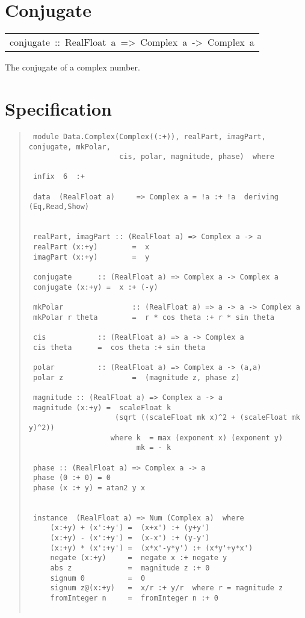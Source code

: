 \section{Conjugate
}
\begin{haddockdesc}
\item[\begin{tabular}{@{}l}
conjugate\ ::\ RealFloat\ a\ =>\ Complex\ a\ ->\ Complex\ a
\end{tabular}]\haddockbegindoc
The conjugate of a complex number.
\par

\end{haddockdesc}
\section{Specification
}
\begin{quote}
{\haddockverb\begin{verbatim}
 module Data.Complex(Complex((:+)), realPart, imagPart, conjugate, mkPolar,
                     cis, polar, magnitude, phase)  where
 
 infix  6  :+
 
 data  (RealFloat a)     => Complex a = !a :+ !a  deriving (Eq,Read,Show)
 
 
 realPart, imagPart :: (RealFloat a) => Complex a -> a
 realPart (x:+y)        =  x
 imagPart (x:+y)        =  y
 
 conjugate      :: (RealFloat a) => Complex a -> Complex a
 conjugate (x:+y) =  x :+ (-y)
 
 mkPolar                :: (RealFloat a) => a -> a -> Complex a
 mkPolar r theta        =  r * cos theta :+ r * sin theta
 
 cis            :: (RealFloat a) => a -> Complex a
 cis theta      =  cos theta :+ sin theta
 
 polar          :: (RealFloat a) => Complex a -> (a,a)
 polar z                =  (magnitude z, phase z)
 
 magnitude :: (RealFloat a) => Complex a -> a
 magnitude (x:+y) =  scaleFloat k
                    (sqrt ((scaleFloat mk x)^2 + (scaleFloat mk y)^2))
                   where k  = max (exponent x) (exponent y)
                         mk = - k
 
 phase :: (RealFloat a) => Complex a -> a
 phase (0 :+ 0) = 0
 phase (x :+ y) = atan2 y x
 
 
 instance  (RealFloat a) => Num (Complex a)  where
     (x:+y) + (x':+y') =  (x+x') :+ (y+y')
     (x:+y) - (x':+y') =  (x-x') :+ (y-y')
     (x:+y) * (x':+y') =  (x*x'-y*y') :+ (x*y'+y*x')
     negate (x:+y)     =  negate x :+ negate y
     abs z             =  magnitude z :+ 0
     signum 0          =  0
     signum z@(x:+y)   =  x/r :+ y/r  where r = magnitude z
     fromInteger n     =  fromInteger n :+ 0
 

\end{verbatim}}
\end{quote}
